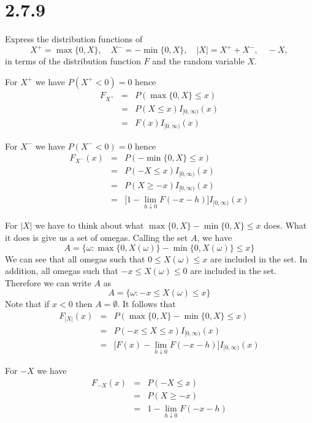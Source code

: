 \section*{2.7.9}
Express the distribution functions of
$$X^+=\max\{0,X\},\quad
X^-=-\min\{0,X\},\quad
|X|=X^++X^-,\quad-X,$$
in terms of the distribution function $F$ and the random variable $X$.

\bigskip
\noindent
For $X^+$ we have $P(X^+<0)=0$ hence
\begin{eqnarray*}
F_{X^+}&=&P(\max\{0,X\}\le x)\\
&=&P(X\le x)I_{[0,\infty)}(x)\\
&=&F(x)I_{[0,\infty)}(x)
\end{eqnarray*}

\bigskip
\noindent
For $X^-$ we have $P(X^-<0)=0$ hence
\begin{eqnarray*}
F_{X^-}(x)&=&P(-\min\{0,X\}\le x)\\
&=&P(-X\le x)I_{[0,\infty)}(x)\\
&=&P(X\ge -x)I_{[0,\infty)}(x)\\
&=&\bigg[1-\lim_{h\downarrow0}F(-x-h)\bigg]I_{[0,\infty)}(x)
\end{eqnarray*}

\bigskip
\noindent
For $|X|$ we have to think about what
$\max\{0,X\}-\min\{0,X\}\le x$ does.
What it does is give us a set of omegas.
Calling the set $A$, we have
$$A=\{\omega:\max\{0,X(\omega)\}-\min\{0,X(\omega)\}\le x\}$$
We can see that all omegas such that $0\le X(\omega)\le x$ are
included in the set.
In addition, all omegas such that $-x\le X(\omega)\le0$ are
included in the set.
Therefore we can write $A$ as
$$A=\{\omega:-x\le X(\omega)\le x\}$$
Note that if $x<0$ then $A=\emptyset$.
It follows that
\begin{eqnarray*}
F_{|X|}(x)&=&P(\max\{0,X\}-\min\{0,X\}\le x)\\
&=&P(-x\le X\le x)I_{[0,\infty)}(x)\\
&=&\bigg[F(x)-\lim_{h\downarrow0}F(-x-h)\bigg]I_{[0,\infty)}(x)
\end{eqnarray*}


\bigskip
\noindent
For $-X$ we have
\begin{eqnarray*}
F_{-X}(x)&=&P(-X\le x)\\
&=&P(X\ge -x)\\
&=&1-\lim_{h\downarrow0}F(-x-h)
\end{eqnarray*}
